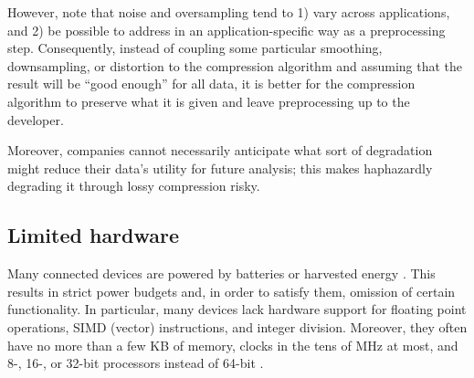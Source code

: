 However, note that noise and oversampling tend to 1) vary across applications, and 2) be possible to address in an application-specific way as a preprocessing step. Consequently, instead of coupling some particular smoothing, downsampling, or distortion to the compression algorithm and assuming that the result will be ``good enough'' for all data, it is better for the compression algorithm to preserve what it is given and leave preprocessing up to the developer.




Moreover, companies cannot necessarily anticipate what sort of degradation might reduce their data's utility for future analysis; this makes haphazardly degrading it through lossy compression risky.

\subsection{Limited hardware}

Many connected devices are powered by batteries or harvested energy \cite{calhoun}. This results in strict power budgets and, in order to satisfy them, omission of certain functionality. In particular, many devices lack hardware support for floating point operations, SIMD (vector) instructions, and integer division. Moreover, they often have no more than a few KB of memory, clocks in the tens of MHz at most, and 8-, 16-, or 32-bit processors instead of 64-bit \cite{cc2540, intelWhatever}.

